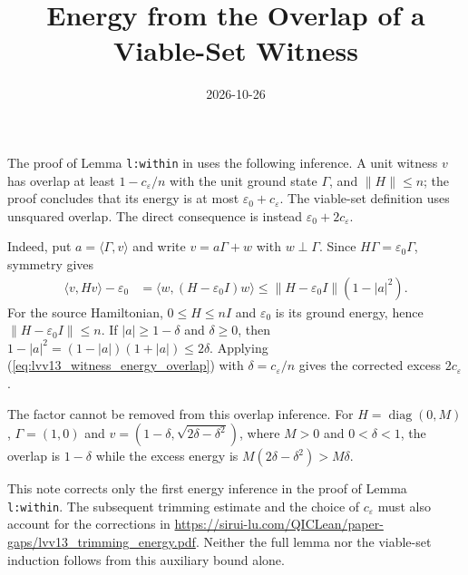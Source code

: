 \documentclass{article}
\title{Energy from the Overlap of a Viable-Set Witness}
\author{}
\date{2026-10-26}
\begin{document}
\maketitle
{}

The proof of Lemma \texttt{l:within} in
\cite[source file \texttt{algo53.tex}, lines 509--515]{Landau2013PolynomialTime}
uses the following inference. A unit witness $v$ has overlap at least
$1-c_\varepsilon/n$ with the unit ground state $\Gamma$, and $\|H\|\le n$;
the proof concludes that its energy is at most $\varepsilon_0+c_\varepsilon$.
The viable-set definition uses unsquared overlap. The direct consequence is
instead $\varepsilon_0+2c_\varepsilon$.

Indeed, put $a=\langle\Gamma,v\rangle$ and write $v=a\Gamma+w$ with
$w\perp\Gamma$. Since $H\Gamma=\varepsilon_0\Gamma$, symmetry gives
\begin{align}
    \langle v,Hv\rangle-\varepsilon_0
     & =\langle w,(H-\varepsilon_0 I)w\rangle
    \le \|H-\varepsilon_0 I\|(1-|a|^2).
    \label{eq:lvv13_witness_energy_overlap}
\end{align}
For the source Hamiltonian, $0\le H\le nI$ and $\varepsilon_0$ is its
ground energy, hence $\|H-\varepsilon_0 I\|\le n$. If
$|a|\ge1-\delta$ and $\delta\ge0$, then
$1-|a|^2=(1-|a|)(1+|a|)\le2\delta$. Applying
(\ref{eq:lvv13_witness_energy_overlap}) with $\delta=c_\varepsilon/n$
gives the corrected excess $2c_\varepsilon$.

The factor cannot be removed from this overlap inference. For
$H=\operatorname{diag}(0,M)$, $\Gamma=(1,0)$ and
$v=(1-\delta,\sqrt{2\delta-\delta^2})$, where $M>0$ and $0<\delta<1$,
the overlap is $1-\delta$ while the excess energy is
$M(2\delta-\delta^2)>M\delta$.

This note corrects only the first energy inference in the proof of
Lemma \texttt{l:within}. The subsequent trimming estimate and the choice
of $c_\varepsilon$ must also account for the corrections in
\url{https://sirui-lu.com/QICLean/paper-gaps/lvv13_trimming_energy.pdf}.
Neither the full lemma nor the viable-set
induction follows from this auxiliary bound alone.



\end{document}
